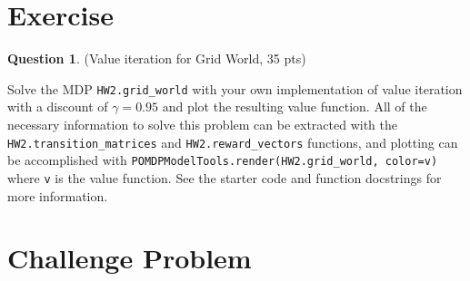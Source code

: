 \documentclass{article}
\theoremstyle{definition}
\newtheorem{question}[thm]{Question}
\begin{document}
\section*{Exercise}

\begin{question} \label{q:gw}
    (Value iteration for Grid World, 35 pts)

    Solve the MDP \texttt{HW2.grid\_world} with your own implementation of value iteration with a discount of $\gamma=0.95$ and plot the resulting value function. All of the necessary information to solve this problem can be extracted with the \texttt{HW2.transition\_matrices} and \texttt{HW2.reward\_vectors} functions, and plotting can be accomplished with \texttt{POMDPModelTools.render(HW2.grid\_world, color=v)} where \texttt{v} is the value function. See the starter code and function docstrings for more information.
\end{question}

\section*{Challenge Problem}
\end{document}
